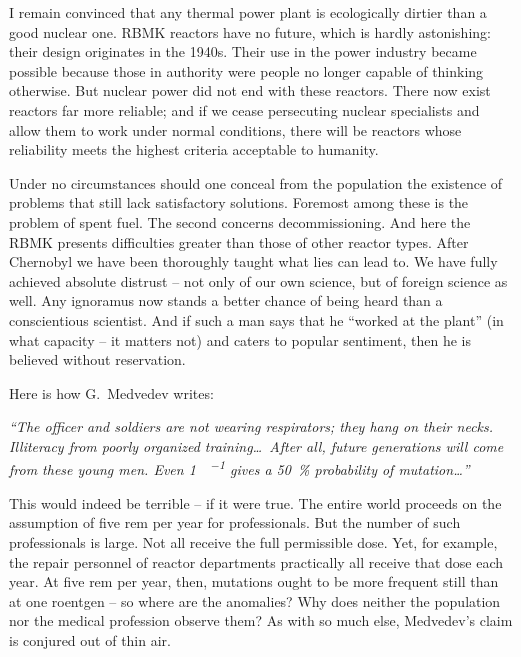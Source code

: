 \documentclass[openright]{bookest}
\begin{document}
I remain convinced that any thermal power plant is ecologically dirtier than a good nuclear one. RBMK reactors have no future, which is hardly astonishing: their design originates in the 1940s. Their use in the power industry became possible because those in authority were people no longer capable of thinking otherwise. But nuclear power did not end with these reactors. There now exist reactors far more reliable; and if we cease persecuting nuclear specialists and allow them to work under normal conditions, there will be reactors whose reliability meets the highest criteria acceptable to humanity.

Under no circumstances should one conceal from the population the existence of problems that still lack satisfactory solutions. Foremost among these is the problem of spent fuel. The second concerns decommissioning. And here the RBMK presents difficulties greater than those of other reactor types. After Chernobyl we have been thoroughly taught what lies can lead to. We have fully achieved absolute distrust -- not only of our own science, but of foreign science as well. Any ignoramus now stands a better chance of being heard than a conscientious scientist. And if such a man says that he ``worked at the plant'' (in what capacity -- it matters not) and caters to popular sentiment, then he is believed without reservation.

Here is how G.~Medvedev writes:

\begin{personal}
\textit{``The officer and soldiers are not wearing respirators; they hang on their necks. Illiteracy from poorly organized training\ldots~After all, future generations will come from these young men. Even \qty{1}{\roentgen\per\Year} gives a \qty{50}{\percent} probability of mutation\ldots''}
\end{personal}

This would indeed be terrible -- if it were true. The entire world proceeds on the assumption of five rem per year for professionals. But the number of such professionals is large. Not all receive the full permissible dose. Yet, for example, the repair personnel of reactor departments practically all receive that dose each year. At five rem per year, then, mutations ought to be more frequent still than at one roentgen -- so where are the anomalies? Why does neither the population nor the medical profession observe them? As with so much else, Medvedev's claim is conjured out of thin air.
\end{document}
